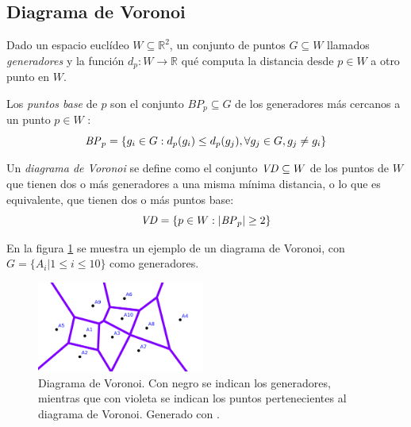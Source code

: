 \subsection{Diagrama de Voronoi}\label{sec:VD}
Dado un espacio euclídeo $W \subseteq \mathds{R}^2$, un conjunto de puntos $G \subseteq W$ llamados \emph{generadores} y la función $d_p : W \rightarrow \mathds{R}$ qué computa la distancia desde $p\in W$ a otro punto en $W$. 

Los \emph{puntos base} de $p$ son el conjunto $BP_p \subseteq G$ de los generadores más cercanos a un punto $p \in W$ :
\begin{equation}
  \mathit{BP}_p =\{g_i \in G : d_p(g_i) \leq d_p(g_j), \forall g_j\in G,g_j \neq g_i\}\label{eq:bases}
\end{equation}

Un \emph{diagrama de Voronoi} se define como el conjunto $\mathit{VD}\subseteq W$ de los puntos de $W$ que tienen dos o más generadores a una misma mínima distancia, o lo que es equivalente, que tienen dos o más puntos base: 
\begin{equation}
  \mathit{VD} = \{p \in W : |\mathit{BP}_p| \geq 2\}\label{eq:VD}
\end{equation}


En la figura \ref{fig:ejemploVoronoi} se muestra un ejemplo de un diagrama de Voronoi, con $G=\{A_i | 1\leq i \leq 10\}$ como generadores.
\begin{figure}[H]
  \center
  \includegraphics[width=5.5cm]{imagenes/VD.png}
  \caption[Diagrama de Voronoi.]{Diagrama de Voronoi. Con negro se indican los generadores, mientras que con violeta se indican los puntos pertenecientes al diagrama de Voronoi. Generado con \cite{voronoigeo}.}\label{fig:ejemploVoronoi}
\end{figure} 

